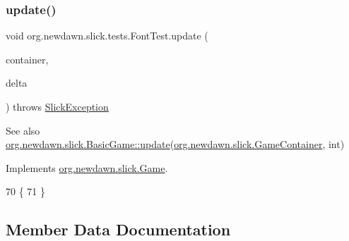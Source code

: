 \mbox{\label{classorg_1_1newdawn_1_1slick_1_1tests_1_1_font_test_a0abf74d4516d32b8cb985439c22c4dd6}} 
\subsubsection{\texorpdfstring{update()}{update()}}
{\footnotesize\ttfamily void org.\+newdawn.\+slick.\+tests.\+Font\+Test.\+update (\begin{DoxyParamCaption}\item[{\mbox{\hyperlink{classorg_1_1newdawn_1_1slick_1_1_game_container}{Game\+Container}}}]{container,  }\item[{int}]{delta }\end{DoxyParamCaption}) throws \mbox{\hyperlink{classorg_1_1newdawn_1_1slick_1_1_slick_exception}{Slick\+Exception}}\hspace{0.3cm}{\ttfamily [inline]}}

\begin{DoxySeeAlso}{See also}
\mbox{\hyperlink{classorg_1_1newdawn_1_1slick_1_1_basic_game_acfe6fa05aef83bff1631af91a3e4bd20}{org.\+newdawn.\+slick.\+Basic\+Game\+::update}}(\mbox{\hyperlink{classorg_1_1newdawn_1_1slick_1_1_game_container}{org.\+newdawn.\+slick.\+Game\+Container}}, int) 
\end{DoxySeeAlso}


Implements \mbox{\hyperlink{interfaceorg_1_1newdawn_1_1slick_1_1_game_ab07b2e9463ee4631620dde0de25bdee8}{org.\+newdawn.\+slick.\+Game}}.


\begin{DoxyCode}
70                                                                                  \{
71     \}
\end{DoxyCode}


\subsection{Member Data Documentation}
\mbox{\label{classorg_1_1newdawn_1_1slick_1_1tests_1_1_font_test_a752b5206f834ae0b0205d67dcb2aa18d}} 
